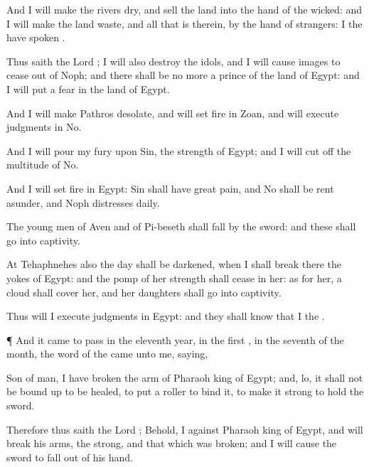 {And I will
make the
rivers
dry, and
sell the
land into the
hand of the
wicked: and I will make the
land
waste, and all that is
therein, by the
hand of
strangers: I the
{} have
spoken
{}.

Thus
saith the
Lord
{}; I will also
destroy the
idols, and I will cause
{}
images to
cease out of
Noph; and there shall be no more a
prince of the
land of
Egypt: and I will
put a
fear in the
land of
Egypt.

And I will make
Pathros
desolate, and will
set
fire in
Zoan, and will
execute
judgments in
No.

And I will
pour my
fury upon
Sin, the
strength of
Egypt; and I will cut
off the
multitude of
No.

And I will
set
fire in
Egypt:
Sin shall have
great
pain, and
No shall be rent
asunder, and
Noph
{}
distresses
daily.

The young
men of
Aven and of
Pi-beseth shall
fall by the
sword: and these
{} shall
go into
captivity.

At
Tehaphnehes also the
day shall be
darkened, when I shall
break there the
yokes of
Egypt: and the
pomp of her
strength shall
cease in
her: as for her, a
cloud shall
cover her, and her
daughters shall
go into
captivity.

Thus will I
execute
judgments in
Egypt: and they shall
know that I
{} the
{}.


\par }{\PP {}¶ And it came to pass in the
eleventh
year, in the
first
{}, in the
seventh
{} of the
month,
{} the
word of the
{} came unto me,
saying,

Son of
man, I have
broken the
arm of
Pharaoh
king of
Egypt; and, lo, it shall not be bound
up to be
healed, to
put a
roller to
bind it, to make it
strong to
hold the
sword.

Therefore thus
saith the
Lord
{}; Behold, I
{} against
Pharaoh
king of
Egypt, and will
break his
arms, the
strong, and that which was
broken; and I will cause the
sword to
fall out of his
hand.

}
